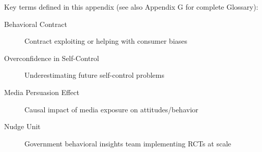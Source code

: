 \begin{abstract}
This appendix integrates Stefano DellaVigna's research on behavioral contracts, media effects, and field experimental evidence into the Evidence-Based Framework. DellaVigna's work bridges theory and empirical evidence, demonstrating how present-biased consumers make predictable mistakes in contract choice (gym memberships), how media systematically influences political behavior (Fox News effect), and establishing benchmarks for what behavioral interventions actually achieve at scale (nudge unit meta-analysis). This appendix provides critical empirical parameters for CORE-WHEN and establishes methodological standards for field evidence in behavioral economics.
\end{abstract}

\begin{tcolorbox}[colback=gray!10!white,colframe=gray!50!black,title=Quick Reference]
Key terms defined in this appendix (see also Appendix G for complete Glossary):
\begin{description}
    \item[Behavioral Contract] Contract exploiting or helping with consumer biases
    \item[Overconfidence in Self-Control] Underestimating future self-control problems
    \item[Media Persuasion Effect] Causal impact of media exposure on attitudes/behavior
    \item[Nudge Unit] Government behavioral insights team implementing RCTs at scale
\end{description}
\end{tcolorbox}


